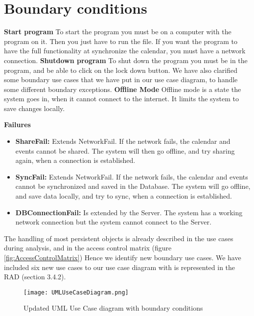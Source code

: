 \section{Boundary conditions}
\textbf{Start program}
To start the program you must be on a computer with the program on it. Then you just have to run the file. If you want the program to have the full functionality at synchronize the calendar, you must have a network connection. 
\newline
\newline
\textbf{Shutdown program}
To shut down the program you must be in the program, and be able to click on the lock down button. 
We have also clarified some boundary use cases that we have put in our use case diagram, to handle some different boundary exceptions. 
\newline
\newline
\textbf{Offline Mode}
Offline mode is a state the system goes in, when it cannot connect to the internet. It limits the system to save changes locally. 

\textbf{Failures}
\begin{itemize}
	\item \textbf{ShareFail:} Extends NetworkFail. If the network fails, the calendar and events cannot be shared. The system will then go offline, and try sharing again, when a connection is established. 
	\item \textbf{SyncFail:} Extends NetworkFail. If the network fails, the calendar and events cannot be synchronized and saved in the Database. The system will go offline, and save data locally, and try to sync, when a connection is established.
	\item \textbf{DBConnectionFail:} Is extended by the Server. The system has a working network connection but the system cannot connect to the Server. 
\end{itemize}
The handling of most persistent objects is already described in the use cases during analysis, and in the access control matrix (figure \ref{fig:AccessControlMatrix}) 
Hence we identify new boundary use cases. We have included six new use cases to our use case diagram with is represented in the RAD (section 3.4.2). 


\begin{figure}[h]
\centering
\texttt{[image: UMLUseCaseDiagram.png]}
\caption{Updated UML Use Case diagram with  boundary conditions \label{overflow}}
\label{figur:usecase}
\end{figure}